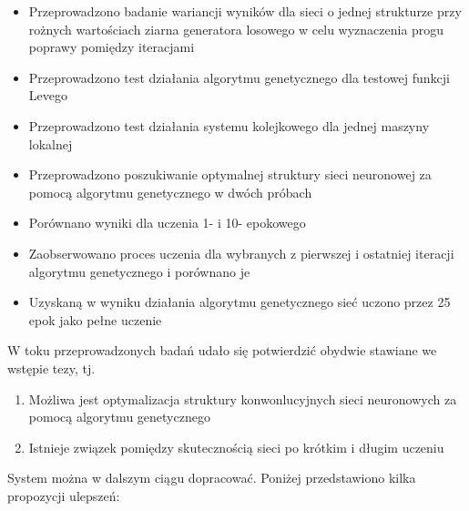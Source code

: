 \begin{itemize}
  \item Przeprowadzono badanie wariancji wyników dla sieci o jednej strukturze przy rożnych wartościach ziarna generatora losowego w celu wyznaczenia progu poprawy pomiędzy iteracjami
  \item Przeprowadzono test działania algorytmu genetycznego dla testowej funkcji Levego
  \item Przeprowadzono test działania systemu kolejkowego dla jednej maszyny lokalnej
  \item Przeprowadzono poszukiwanie optymalnej struktury sieci neuronowej za pomocą algorytmu genetycznego w dwóch próbach
  \item Porównano wyniki dla uczenia 1- i 10- epokowego
  \item Zaobserwowano proces uczenia dla wybranych z pierwszej i ostatniej iteracji algorytmu genetycznego i porównano je
  \item Uzyskaną w wyniku działania algorytmu genetycznego sieć uczono przez 25 epok jako pełne uczenie
\end{itemize}

W toku przeprowadzonych badań udało się potwierdzić obydwie stawiane we wstępie tezy, tj.

\begin{enumerate}
  \item Możliwa jest optymalizacja struktury konwonlucyjnych sieci neuronowych za pomocą algorytmu genetycznego
  \item Istnieje związek pomiędzy skutecznością sieci po krótkim i długim uczeniu
\end{enumerate}

System można w dalszym ciągu dopracować.
Poniżej przedstawiono kilka propozycji ulepszeń:

